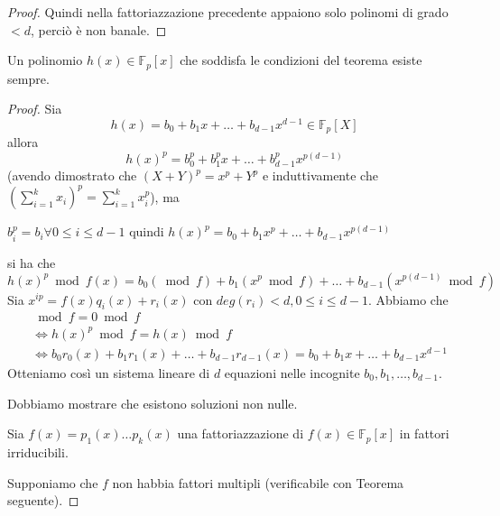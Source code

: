 \documentclass[10pt,a4paper,twoside]{book}
\begin{document}
\begin{proof}
    Quindi nella fattoriazzazione precedente appaiono solo polinomi di grado $< d$, perciò è non banale.
\end{proof}

\begin{proposition}
    Un polinomio $h(x) \in \mathbb{F}_p[x]$ che soddisfa le condizioni del teorema esiste sempre.
\end{proposition}
\begin{proof}
    Sia
    \begin{equation*}
        h(x) = b_0 + b_1 x + \ldots + b_{d - 1} x^{d - 1} \in \mathbb{F}_p[X]
    \end{equation*}
    allora
    \begin{equation*}
        h(x)^p = b_0^p + b_1^p x + \ldots + b_{d - 1}^p x^{p(d - 1)}
    \end{equation*}
    (avendo dimostrato che $(X + Y)^p = x^p + Y^p$ e induttivamente che $(\sum_{i=1}^{k} x_i)^p = \sum_{i=1}^{k} x_i^p$), ma
    \begin{center}
        $b_i^p = b_i \forall 0 \leq i \leq d - 1$ quindi $h(x)^p = b_0 + b_1 x^p + \ldots + b_{d - 1} x^{p(d - 1)}$
    \end{center}
    si ha che
    \begin{equation*}
        h(x)^p \bmod f(x) = b_0 (\bmod f) + b_1 (x^p \bmod f) + \ldots + b_{d - 1} (x^{p(d - 1)} \bmod f)
    \end{equation*}
    Sia $x^{ip} = f(x) q_i(x) + r_i(x)$ con $deg(r_i) < d, 0 \leq i \leq d - 1$. Abbiamo che
    \begin{align*}
        [h(x)^p - h(x)] & \bmod f = 0 \bmod f                                                                                         \\
                        & \iff h(x)^p \bmod f = h(x) \bmod f                                                                          \\
                        & \iff b_0 r_0(x) + b_1 r_1(x) + \ldots + b_{d - 1} r_{d - 1}(x) = b_0 + b_1 x + \ldots + b_{d - 1} x^{d - 1}
    \end{align*}
    Otteniamo così un sistema lineare di $d$ equazioni nelle incognite $b_0, b_1, \ldots, b_{d-1}$.

    Dobbiamo mostrare che esistono soluzioni non nulle.

    Sia $f(x) = p_1(x) \ldots p_k(x)$ una fattoriazzazione di $f(x) \in \mathbb{F}_p[x]$ in fattori irriducibili.

    Supponiamo che $f$ non habbia fattori multipli (verificabile con Teorema seguente).
\end{proof}
\end{document}
